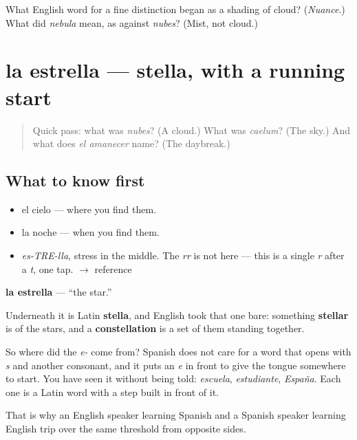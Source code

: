 \begin{tcolorbox}[breakable,colback=teal!4,colframe=teal!35!black,title={Before you move on}]
What English word for a fine distinction began as a shading of cloud? (\emph{Nuance}.) What did \emph{nebula} mean, as against \emph{nubes}? (Mist, not cloud.)
\end{tcolorbox}
\section[la estrella]{la estrella — stella, with a running start}

\label{lesson:ES-C289-estrella}



\begin{quote}
Quick pass: what was \emph{nubes}? (A cloud.) What was \emph{caelum}? (The sky.) And what does \emph{el amanecer} name? (The daybreak.)
\end{quote}

\subsection*{What to know first}
\begin{itemize}
\raggedright
  \item el cielo — where you find them.
  \item la noche — when you find them.
\end{itemize}

\begin{sounds}
\begin{itemize}
\raggedright
  \item \emph{es-TRE-lla}, stress in the middle. The \emph{rr} is not here — this is a single \emph{r} after a \emph{t}, one tap. $\to$ reference
\end{itemize}
\end{sounds}

\begin{cousinweb}
\textbf{la estrella} — \textquotedblleft{}the star.\textquotedblright{}

Underneath it is Latin \textbf{stella}, and English took that one bare: something \textbf{stellar} is of the stars, and a \textbf{constellation} is a set of them standing together.

So where did the \emph{e-} come from? Spanish does not care for a word that opens with \emph{s} and another consonant, and it puts an \emph{e} in front to give the tongue somewhere to start. You have seen it without being told: \emph{escuela}, \emph{estudiante}, \emph{España}. Each one is a Latin word with a step built in front of it.

That is why an English speaker learning Spanish and a Spanish speaker learning English trip over the same threshold from opposite sides.
\end{cousinweb}

